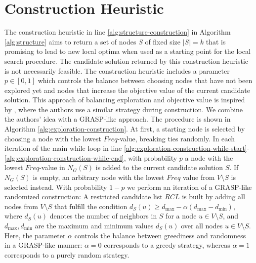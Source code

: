 \documentclass[draft,final]{vutinfth} %
\begin{document}
\section{Construction Heuristic}\label{sec:construction-heuristic}

The construction heuristic in line \ref{alg:structure-construction} in Algorithm \ref{alg:structure} aims to return a set of nodes $S$ of fixed size $|S| = k$ that is promising to lead to new local optima when used as a starting point for the local search procedure. The candidate solution returned by this construction heuristic is not necessarily feasible. 
The construction heuristic includes a parameter $p \in [0,1]$ which controls the balance between choosing nodes that have not been explored yet and nodes that increase the objective value of the current candidate solution. This approach of balancing exploration and objective value is inspired by \cite{chen_nuqclq_2021}, where the authors use a similar strategy during construction. We combine the authors' idea with a GRASP-like approach. The procedure is shown in Algorithm \ref{alg:exploration-construction}. 
At first, a starting node is selected by choosing a node with the lowest $Freq$-value, breaking ties randomly. In each iteration of the main while loop in line \ref{alg:exploration-construction-while-start}-\ref{alg:exploration-construction-while-end}, with probability $p$ a node with the lowest $Freq$-value in $N_G(S)$ is added to the current candidate solution $S$. If $N_G(S)$ is empty, an arbitrary node with the lowest $Freq$ value from $V\setminus S$ is selected instead. 
With probability $1-p$ we perform an iteration of a GRASP-like randomized construction: A restricted candidate list $\mathit{RCL}$ is built by adding all nodes from $V \setminus S$ that fulfill the condition $d_S(u) \geq d_{\max} - \alpha(d_{\max} - d_{\min})$, where $d_S(u)$ denotes the number of neighbors in $S$ for a node $u \in V \setminus S$, and $d_{\max}, d_{\min}$ are the maximum and minimum values $d_S(u)$ over all nodes $u\in V \setminus S$. Here, the parameter $\alpha$ controls the balance between greediness and randomness in a GRASP-like manner: $\alpha=0$ corresponds to a greedy strategy, whereas $\alpha=1$ corresponds to a purely random strategy.  
\end{document}
